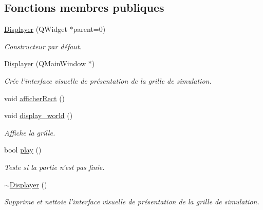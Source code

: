 \subsection*{Fonctions membres publiques}
\begin{DoxyCompactItemize}
\item 
\hyperlink{classDisplayer_a04104e09562ed9f64a96174ab5409dc2}{Displayer} (Q\-Widget $\ast$parent=0)
\begin{DoxyCompactList}\small\item\em Constructeur par défaut. \end{DoxyCompactList}\item 
\hyperlink{classDisplayer_a099a08baae9c7985acf6cca4fa2d0509}{Displayer} (Q\-Main\-Window $\ast$)
\begin{DoxyCompactList}\small\item\em Crée l'interface visuelle de présentation de la grille de simulation. \end{DoxyCompactList}\item 
void \hyperlink{classDisplayer_a06d6e9b18c26c121d21d95bb5a352ee0}{afficher\-Rect} ()
\item 
\hypertarget{classDisplayer_a43b024cbfed7610ee3b91a7ba52a1a5b}{void \hyperlink{classDisplayer_a43b024cbfed7610ee3b91a7ba52a1a5b}{display\-\_\-world} ()}\label{classDisplayer_a43b024cbfed7610ee3b91a7ba52a1a5b}

\begin{DoxyCompactList}\small\item\em Affiche la grille. \end{DoxyCompactList}\item 
bool \hyperlink{classDisplayer_a60656ce57ab16d1265fea3dfa5bf22cf}{play} ()
\begin{DoxyCompactList}\small\item\em Teste si la partie n'est pas finie. \end{DoxyCompactList}\item 
\hypertarget{classDisplayer_a9f5cdcdfae1594e835973926df0da537}{\hyperlink{classDisplayer_a9f5cdcdfae1594e835973926df0da537}{$\sim$\-Displayer} ()}\label{classDisplayer_a9f5cdcdfae1594e835973926df0da537}

\begin{DoxyCompactList}\small\item\em Supprime et nettoie l'interface visuelle de présentation de la grille de simulation. \end{DoxyCompactList}\end{DoxyCompactItemize}
